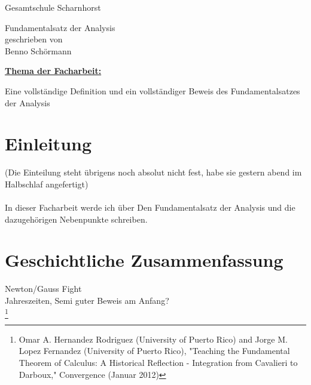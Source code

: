 \documentclass[fontsize=12pt,paper=a4,DIV12,cleardoublepage=empty, 
liststotoc,idxtotoc,bibtotoc]{article}
\theoremstyle{plain}
\theoremstyle{definition}
\begin{document}
	\begin{titlepage}
		\vspace*{-3cm}
		\noindent
		\hspace*{1cm}
			\begin{center}
				\centering
				{\LARGE Gesamtschule Scharnhorst}
			\end{center}
		\begin{center}
		\Large{Fundamentalsatz der Analysis}\\[0.5cm]
		\normalsize{geschrieben von}\\[0.25cm]	
		\large{Benno Schörmann}\\[0.5cm]
		\end{center}
	\begin{flushleft}
	\hyperref[subsec:thema1]{\textbf{\large Thema der Facharbeit:}}  \\
	\end{flushleft}
	Eine vollständige Definition und ein vollständiger Beweis des Fundamentalsatzes der Analysis
	\quad \\[1.5cm]
	\noindent 
	\renewcommand{\arraystretch}{1.4}
	\end{titlepage}
	\newpage
	\thispagestyle{empty}
	\tableofcontents
	\newpage
	\section{Einleitung}
	(Die Einteilung steht übrigens noch absolut nicht fest, habe sie gestern abend im Halbschlaf angefertigt) \\\\
	In dieser Facharbeit werde ich über Den Fundamentalsatz der Analysis und die dazugehörigen Nebenpunkte schreiben.
	
	
	
	\section{Geschichtliche Zusammenfassung}
	Newton/Gauss Fight\\
	Jahreszeiten, Semi guter Beweis am Anfang?\\
	\footnote{Omar A. Hernandez Rodriguez (University of Puerto Rico) and Jorge M. Lopez Fernandez (University of Puerto Rico), "Teaching the Fundamental Theorem of Calculus: A Historical Reflection - Integration from Cavalieri to Darboux," Convergence (Januar 2012)}
	
	
	
\end{document}
